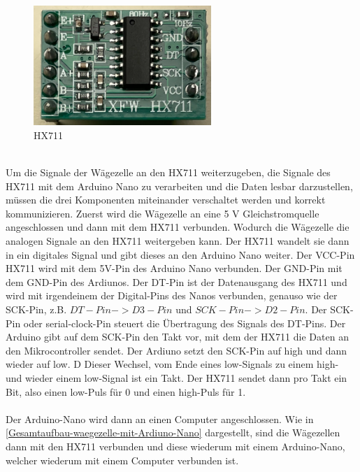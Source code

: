 \begin{figure}[h!]
    \centering
    \includegraphics[width=0.6\textwidth]{img/HX711.png}
    \caption{HX711 \cite{prilchen}}
    \label{fig:HX711}
\end{figure}
\\
Um die Signale der Wägezelle an den HX711 weiterzugeben, die Signale des HX711 mit dem Arduino Nano zu verarbeiten und die Daten lesbar darzustellen, müssen die drei Komponenten miteinander verschaltet werden und korrekt kommunizieren.
Zuerst wird die Wägezelle an eine 5 V Gleichstromquelle angeschlossen und dann mit dem HX711 verbunden.
 Wodurch die Wägezelle die analogen Signale an den HX711 weitergeben kann.
 Der HX711 wandelt sie dann in ein digitales Signal und gibt dieses an den Arduino Nano weiter.
 Der VCC-Pin HX711 wird mit dem 5V-Pin des Arduino Nano verbunden.
 Der GND-Pin mit dem GND-Pin des Ardiunos.
 Der DT-Pin ist der Datenausgang des HX711 und wird mit irgendeinem der Digital-Pins des Nanos verbunden, genauso wie der SCK-Pin, z.B. $DT-Pin -> D3-Pin$ und $SCK-Pin -> D2-Pin$.
 Der SCK-Pin oder serial-clock-Pin steuert die Übertragung des Signals des DT-Pins.
 Der Arduino gibt auf dem SCK-Pin den Takt vor, mit dem der HX711 die Daten an den Mikrocontroller sendet.
 Der Ardiuno setzt den SCK-Pin auf high und dann wieder auf low. D
 Dieser Wechsel, vom Ende eines low-Signals zu einem high- und wieder einem low-Signal ist ein Takt.
 Der HX711 sendet dann pro Takt ein Bit, also einen low-Puls für 0 und einen high-Puls für 1.
\\
\\
Der Arduino-Nano wird dann an einen Computer angeschlossen. Wie in \autoref{Gesamtaufbau-waegezelle-mit-Ardiuno-Nano} dargestellt, sind die Wägezellen dann mit den HX711 verbunden und diese wiederum mit einem Arduino-Nano, welcher wiederum mit einem Computer verbunden ist.
